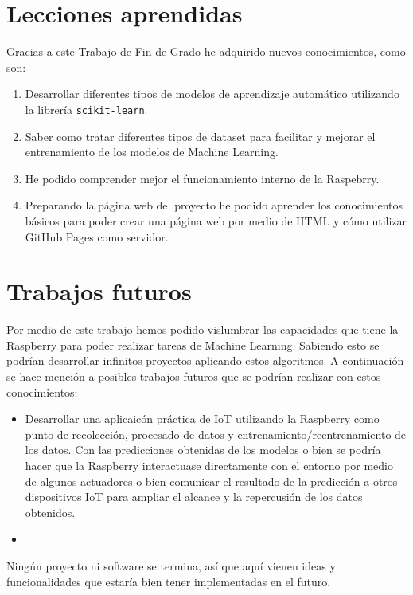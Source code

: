 \documentclass[a4paper, 12pt]{book}
\begin{document}
\section{Lecciones aprendidas}
\label{sec:lecciones_aprendidas}

Gracias a este Trabajo de Fin de Grado he adquirido nuevos conocimientos, como son:

\begin{enumerate}
  \item Desarrollar diferentes tipos de modelos de aprendizaje automático utilizando la librería \texttt{scikit-learn}.
  \item Saber como tratar diferentes tipos de dataset para facilitar y mejorar el entrenamiento de los modelos de Machine Learning.
  \item He podido comprender mejor el funcionamiento interno de la Raspebrry.
  \item Preparando la página web del proyecto he podido aprender los conocimientos básicos para poder crear una página web por medio de HTML y cómo utilizar GitHub Pages como servidor.
\end{enumerate} 


\section{Trabajos futuros}
\label{sec:trabajos_futuros}

Por medio de este trabajo hemos podido vislumbrar las capacidades que tiene la Raspberry para poder realizar tareas de Machine Learning. Sabiendo esto se podrían desarrollar infinitos proyectos aplicando estos algoritmos. A continuación se hace mención a posibles trabajos futuros que se podrían realizar con estos conocimientos:

\begin{itemize}
    \item Desarrollar una aplicaicón práctica de IoT utilizando la Raspberry como punto de recolección, procesado de datos y entrenamiento/reentrenamiento de los datos. Con las predicciones obtenidas de los modelos o bien se podría hacer que la Raspberry interactuase directamente con el entorno por medio de algunos actuadores o bien comunicar el resultado de la predicción a otros dispositivos IoT para ampliar el alcance y la repercusión de los datos obtenidos.
    
    \item 
\end{itemize}
Ningún proyecto ni software se termina, así que aquí vienen ideas y funcionalidades que estaría bien tener implementadas en el futuro.
\end{document}
